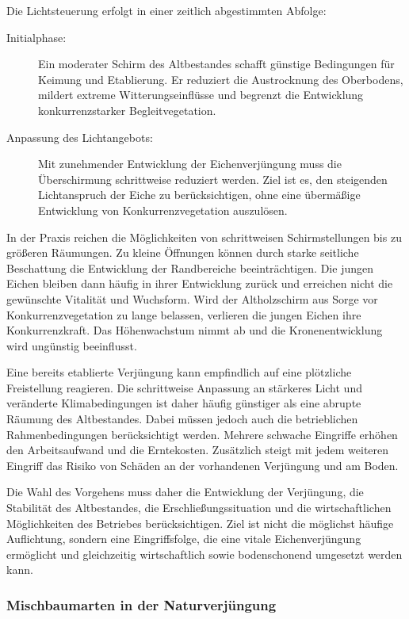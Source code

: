 \documentclass[twocolumn, bibliography=totoc, abstract=true]{scrartcl}
\begin{document}
Die Lichtsteuerung erfolgt in einer zeitlich abgestimmten Abfolge:

\begin{description}
\item[Initialphase:] Ein moderater Schirm des Altbestandes schafft günstige Bedingungen für Keimung und Etablierung. Er reduziert die Austrocknung des Oberbodens, mildert extreme Witterungseinflüsse und begrenzt die Entwicklung konkurrenzstarker Begleitvegetation.
\item[Anpassung des Lichtangebots:] Mit zunehmender Entwicklung der Eichenverjüngung muss die Überschirmung schrittweise reduziert werden. Ziel ist es, den steigenden Lichtanspruch der Eiche zu berücksichtigen, ohne eine übermäßige Entwicklung von Konkurrenzvegetation auszulösen.
\end{description}

In der Praxis reichen die Möglichkeiten von schrittweisen Schirmstellungen bis zu größeren Räumungen. Zu kleine Öffnungen können durch starke seitliche Beschattung die Entwicklung der Randbereiche beeinträchtigen. Die jungen Eichen bleiben dann häufig in ihrer Entwicklung zurück und erreichen nicht die gewünschte Vitalität und Wuchsform. Wird der Altholzschirm aus Sorge vor Konkurrenzvegetation zu lange belassen, verlieren die jungen Eichen ihre Konkurrenzkraft. Das Höhenwachstum nimmt ab und die Kronenentwicklung wird ungünstig beeinflusst.

Eine bereits etablierte Verjüngung kann empfindlich auf eine plötzliche Freistellung reagieren. Die schrittweise Anpassung an stärkeres Licht und veränderte Klimabedingungen ist daher häufig günstiger als eine abrupte Räumung des Altbestandes. Dabei müssen jedoch auch die betrieblichen Rahmenbedingungen berücksichtigt werden. Mehrere schwache Eingriffe erhöhen den Arbeitsaufwand und die Erntekosten. Zusätzlich steigt mit jedem weiteren Eingriff das Risiko von Schäden an der vorhandenen Verjüngung und am Boden.

Die Wahl des Vorgehens muss daher die Entwicklung der Verjüngung, die Stabilität des Altbestandes, die Erschließungssituation und die wirtschaftlichen Möglichkeiten des Betriebes berücksichtigen. Ziel ist nicht die möglichst häufige Auflichtung, sondern eine Eingriffsfolge, die eine vitale Eichenverjüngung ermöglicht und gleichzeitig wirtschaftlich sowie bodenschonend umgesetzt werden kann.

\subsubsection{Mischbaumarten in der Naturverjüngung}
\end{document}
